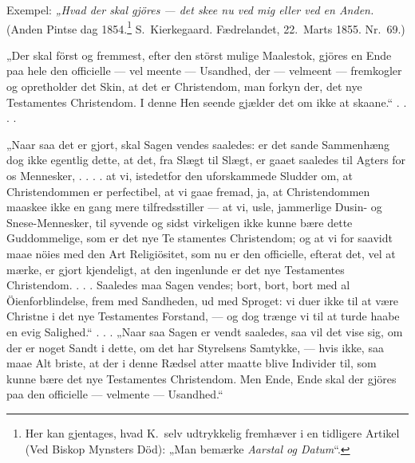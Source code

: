\documentclass[12pt,a4paper]{article}
\newcommand{\opage}[1]{\marginnote{\footnotesize\textit{[#1]}}}
\begin{document}
Exempel: \emph{„Hvad der skal gjöres --- det skee
nu ved mig eller ved en Anden.} (Anden Pintse\-%
dag 1854.\footnote{Her kan gjentages, hvad K.\ selv udtrykkelig fremhæver i en
tidligere Artikel (Ved Biskop Mynsters Död): „Man bemærke
\emph{Aarstal og Datum}“.} S.\ Kierkegaard. Fædrelandet, 22.\ Marts 1855.
Nr.\ 69.)

„Der skal först og fremmest, efter den störst mulige
Maalestok, gjöres en Ende paa hele den officielle --- vel\-%
meente --- Usandhed, der --- velmeent --- fremkogler og
opretholder det Skin, at det er Christendom, man forkyn\-%
der, det nye Testamentes Christendom. I denne Hen\-%
seende gjælder det om ikke at skaane.“ . . . .

„Naar saa det er gjort, skal Sagen vendes saaledes:
er det sande Sammenhæng dog ikke egentlig dette, at
det, fra Slægt til Slægt, er gaaet saaledes til Agters for
os Mennesker, . . . . at vi, istedetfor den uforskammede
Sludder om, at Christendommen er perfectibel, at vi
gaae fremad, ja, at Christendommen maaskee ikke en\-%
gang mere tilfredsstiller --- at vi, usle, jammerlige Dusin- og
Snese-Mennesker, til syvende og sidst virkeligen ikke
\opage{26} kunne bære dette Guddommelige, som er det nye Te\-%
stamentes Christendom; og at vi for saavidt maae nöies
med den Art Religiösitet, som nu er den officielle, efterat
det, vel at mærke, er gjort kjendeligt, at den ingenlunde
er det nye Testamentes Christendom. . . . Saaledes maa
Sagen vendes; bort, bort, bort med al Öienforblindelse,
frem med Sandheden, ud med Sproget: vi duer ikke til
at være Christne i det nye Testamentes Forstand, --- og
dog trænge vi til at turde haabe en evig Salighed.“ . . .
„Naar saa Sagen er vendt saaledes, saa vil det vise sig,
om der er noget Sandt i dette, om det har Styrelsens
Samtykke, --- hvis ikke, saa maae Alt briste, at der i
denne Rædsel atter maatte blive Individer til, som kunne
bære det nye Testamentes Christendom. Men Ende,
Ende skal der gjöres paa den officielle --- velmente ---
Usandhed.“
\end{document}
